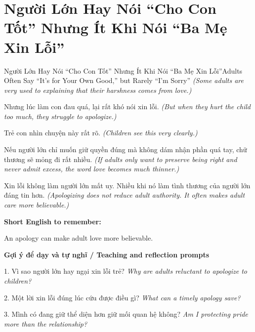 \section{Người Lớn Hay Nói “Cho Con Tốt” Nhưng Ít Khi Nói “Ba Mẹ Xin Lỗi”}
\begin{truyen}{Người Lớn Hay Nói “Cho Con Tốt” Nhưng Ít Khi Nói “Ba Mẹ Xin Lỗi”}{Adults Often Say “It's for Your Own Good,” but Rarely “I'm Sorry”}
\textit{(Some adults are very used to explaining that their harshness comes from love.)}

Nhưng lúc làm con đau quá, lại rất khó nói xin lỗi.
\textit{(But when they hurt the child too much, they struggle to apologize.)}

Trẻ con nhìn chuyện này rất rõ.
\textit{(Children see this very clearly.)}

Nếu người lớn chỉ muốn giữ quyền đúng mà không dám nhận phần quá tay, chữ thương sẽ mỏng đi rất nhiều.
\textit{(If adults only want to preserve being right and never admit excess, the word love becomes much thinner.)}

\end{truyen}

\begin{baihoc}
Xin lỗi không làm người lớn mất uy. Nhiều khi nó làm tình thương của người lớn đáng tin hơn.
\textit{(Apologizing does not reduce adult authority. It often makes adult care more believable.)}
\end{baihoc}

\begin{ghinhoanh}
\textbf{Short English to remember:}

An apology can make adult love more believable.

\end{ghinhoanh}

\begin{tuhocnhanh}
\textbf{Gợi ý để dạy và tự nghĩ / Teaching and reflection prompts}

1. Vì sao người lớn hay ngại xin lỗi trẻ? \textit{Why are adults reluctant to apologize to children?}

2. Một lời xin lỗi đúng lúc cứu được điều gì? \textit{What can a timely apology save?}

3. Mình có đang giữ thể diện hơn giữ mối quan hệ không? \textit{Am I protecting pride more than the relationship?}
\end{tuhocnhanh}
\ngancach

